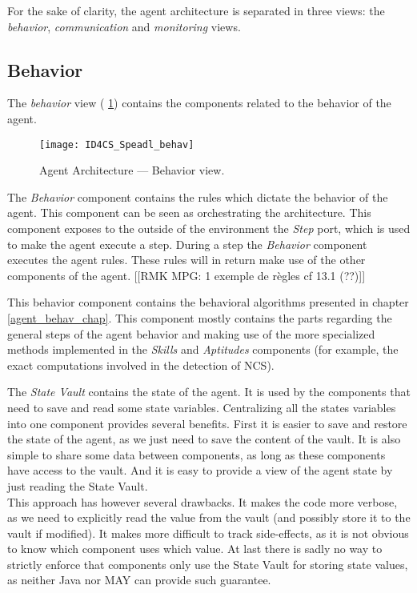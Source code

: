 For the sake of clarity, the agent architecture is separated in three views: the \emph{behavior}, \emph{communication} and \emph{monitoring} views.

\subsection{Behavior}

The \emph{behavior} view (\figurename{} \ref{Arch-behavior}) contains the components related to the behavior of the agent. 

\begin{figure}
\centering
\texttt{[image: ID4CS\_Speadl\_behav]}
\caption{Agent Architecture --- Behavior view.}
\label{Arch-behavior}
\end{figure}

The \emph{Behavior} component contains the rules which dictate the behavior of the agent. This component can be seen as orchestrating the architecture. This component exposes to the outside of the environment the \emph{Step} port, which is used to make the agent execute a step. During a step the \emph{Behavior} component executes the agent rules. These rules will in return make use of the other components of the agent. [[RMK MPG: 1 exemple de règles cf 13.1 (??)]]

This behavior component contains the behavioral algorithms presented in chapter \ref{agent_behav_chap}. This component mostly contains the parts regarding the general steps of the agent behavior and making use of the more specialized methods implemented in the \emph{Skills} and \emph{Aptitudes} components (for example, the exact computations involved in the detection of NCS).

The \emph{State Vault} contains the state of the agent. It is used by the components that need to save and read some state variables. Centralizing all the states variables into one component provides several benefits. First it is easier to save and restore the state of the agent, as we just need to save the content of the vault. It is also simple to share some data between components, as long as these components have access to the vault. And it is easy to provide a view of the agent state by just reading the State Vault.\\
This approach has however several drawbacks. It makes the code more verbose, as we need to explicitly read the value from the vault (and possibly store it to the vault if modified). It makes more difficult to track side-effects, as it is not obvious to know which component uses which value. At last there is sadly no way to strictly enforce that components only use the State Vault for storing state values, as neither Java nor MAY can provide such guarantee.

